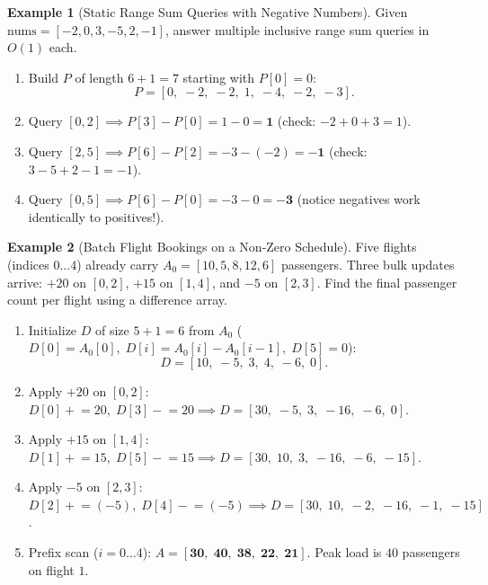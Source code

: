 \documentclass[11pt,a4paper]{article}
\theoremstyle{definition}
\newtheorem{example}{Example}[section]
\begin{document}
\begin{example}[Static Range Sum Queries with Negative Numbers]
Given $\text{nums} = [-2, 0, 3, -5, 2, -1]$, answer multiple inclusive range sum queries in $O(1)$ each.
\begin{enumerate}
    \item Build $P$ of length $6 + 1 = 7$ starting with $P[0] = 0$:
    \[
        P = [0,\; -2,\; -2,\; 1,\; -4,\; -2,\; -3].
    \]
    \item Query $[0, 2] \implies P[3] - P[0] = 1 - 0 = \mathbf{1}$ (check: $-2 + 0 + 3 = 1$).
    \item Query $[2, 5] \implies P[6] - P[2] = -3 - (-2) = \mathbf{-1}$ (check: $3 - 5 + 2 - 1 = -1$).
    \item Query $[0, 5] \implies P[6] - P[0] = -3 - 0 = \mathbf{-3}$ (notice negatives work identically to positives!).
\end{enumerate}
\end{example}

\begin{example}[Batch Flight Bookings on a Non-Zero Schedule]
Five flights (indices $0 \dots 4$) already carry $A_0 = [10, 5, 8, 12, 6]$ passengers. Three bulk updates arrive: $+20$ on $[0, 2]$, $+15$ on $[1, 4]$, and $-5$ on $[2, 3]$. Find the final passenger count per flight using a difference array.
\begin{enumerate}
    \item Initialize $D$ of size $5 + 1 = 6$ from $A_0$ ($D[0] = A_0[0],\; D[i] = A_0[i] - A_0[i - 1],\; D[5] = 0$):
    \[
        D = [10,\; -5,\; 3,\; 4,\; -6,\; 0].
    \]
    \item Apply $+20$ on $[0, 2]$: $D[0] \mathrel{+}= 20,\; D[3] \mathrel{-}= 20 \implies D = [30,\; -5,\; 3,\; -16,\; -6,\; 0]$.
    \item Apply $+15$ on $[1, 4]$: $D[1] \mathrel{+}= 15,\; D[5] \mathrel{-}= 15 \implies D = [30,\; 10,\; 3,\; -16,\; -6,\; -15]$.
    \item Apply $-5$ on $[2, 3]$: $D[2] \mathrel{+}= (-5),\; D[4] \mathrel{-}= (-5) \implies D = [30,\; 10,\; -2,\; -16,\; -1,\; -15]$.
    \item Prefix scan ($i = 0 \dots 4$): $A = [\mathbf{30},\; \mathbf{40},\; \mathbf{38},\; \mathbf{22},\; \mathbf{21}]$. Peak load is $40$ passengers on flight $1$.
\end{enumerate}
\end{example}

\end{document}
